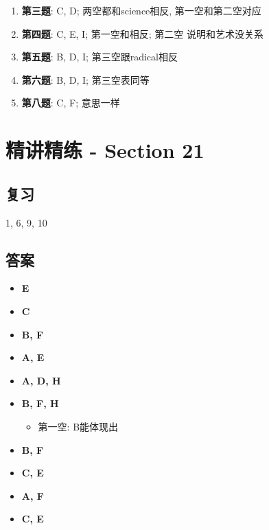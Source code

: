     \begin{enumerate}
      \item \textbf{第三题}: C, D; 两空都和science相反, 第一空和第二空对应
      \item \textbf{第四题}: C, E, I; 第一空和相反; 第二空
      说明和艺术没关系
      \item \textbf{第五题}: B, D, I; 第三空跟radical相反
      \item \textbf{第六题}: B, D, I; 第三空表同等
      \item \textbf{第八题}: C, F; 
      意思一样
    \end{enumerate}

\section{精讲精练 - Section 21}

  \subsection{复习}

    1, 6, 9, 10

  \subsection{答案}

    \begin{itemize}
      \item \textbf{E}
      \item \textbf{C}
      \item \textbf{B, F}
      \item \textbf{A, E}
      \item \textbf{A, D, H}
      \item \textbf{B, F, H}
      \begin{itemize}
        \item 第一空: B能体现出
      \end{itemize}

      \item \textbf{B, F}
      \item \textbf{C, E}
      \item \textbf{A, F}
      \item \textbf{C, E}
    \end{itemize}
